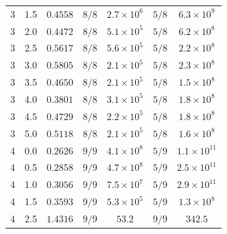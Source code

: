 \begin{table}[ht]
\begin{tabular}{cc c cc cc}
        3 & 1.5 & $0.4558$ & $8/8$ & $2.7 \times 10^{6}$ & $5/8$ & $6.3 \times 10^{9}$ \\
        3 & 2.0 & $0.4472$ & $8/8$ & $5.1 \times 10^{5}$ & $5/8$ & $6.2 \times 10^{8}$ \\
        3 & 2.5 & $0.5617$ & $8/8$ & $5.6 \times 10^{5}$ & $5/8$ & $2.2 \times 10^{8}$ \\
        3 & 3.0 & $0.5805$ & $8/8$ & $2.1 \times 10^{5}$ & $5/8$ & $2.3 \times 10^{8}$ \\
        3 & 3.5 & $0.4650$ & $8/8$ & $2.1 \times 10^{5}$ & $5/8$ & $1.5 \times 10^{8}$ \\
        3 & 4.0 & $0.3801$ & $8/8$ & $3.1 \times 10^{5}$ & $5/8$ & $1.8 \times 10^{8}$ \\
        3 & 4.5 & $0.4729$ & $8/8$ & $2.2 \times 10^{5}$ & $5/8$ & $1.8 \times 10^{8}$ \\
        3 & 5.0 & $0.5118$ & $8/8$ & $2.1 \times 10^{5}$ & $5/8$ & $1.6 \times 10^{8}$ \\
        4 & 0.0 & $0.2626$ & $9/9$ & $4.1 \times 10^{8}$ & $5/9$ & $1.1 \times 10^{11}$ \\
        4 & 0.5 & $0.2858$ & $9/9$ & $4.7 \times 10^{8}$ & $5/9$ & $2.5 \times 10^{11}$ \\
        4 & 1.0 & $0.3056$ & $9/9$ & $7.5 \times 10^{7}$ & $5/9$ & $2.9 \times 10^{11}$ \\
        4 & 1.5 & $0.3593$ & $9/9$ & $5.3 \times 10^{5}$ & $5/9$ & $1.3 \times 10^{8}$ \\
        4 & 2.5 & $1.4316$ & $9/9$ & $53.2$ & $9/9$ & $342.5$ \\
        \bottomrule
    \end{tabular}
\end{table}
